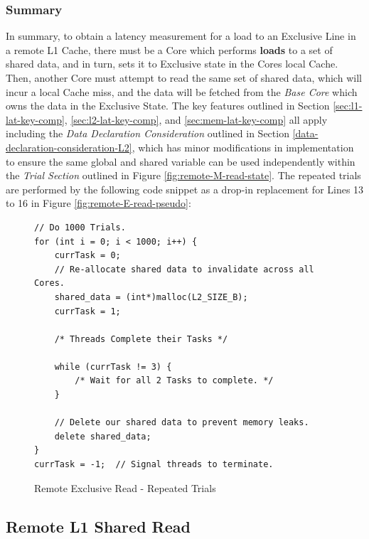 \documentclass[bsc,frontabs,twoside,singlespacing,parskip,deptreport]{infthesis}     %
\begin{document}
\subsubsection{Summary}
In summary, to obtain a latency measurement for a load to an Exclusive Line in a remote L1 Cache, there must be a Core which performs \textbf{loads} to a set of shared data, and in turn, sets it to Exclusive state in the Cores local Cache. Then, another Core must attempt to read the same set of shared data, which will incur a local Cache miss, and the data will be fetched from the \emph{Base Core} which owns the data in the Exclusive State. The key features outlined in Section \ref{sec:l1-lat-key-comp}, \ref{sec:l2-lat-key-comp}, and \ref{sec:mem-lat-key-comp} all apply including the \textit{Data Declaration Consideration} outlined in Section \ref{data-declaration-consideration-L2}, which has minor modifications in implementation to ensure the same global and shared variable can be used independently within the \textit{Trial Section} outlined in Figure \ref{fig:remote-M-read-state}. The repeated trials are performed by the following code snippet as a drop-in replacement for Lines 13 to 16 in Figure \ref{fig:remote-E-read-pseudo}:
\begin{figure}[!h]
    \centering
    \begin{minipage}{0.8\textwidth}
    \begin{verbatim}
// Do 1000 Trials.
for (int i = 0; i < 1000; i++) {
    currTask = 0;
    // Re-allocate shared data to invalidate across all Cores.
    shared_data = (int*)malloc(L2_SIZE_B);
    currTask = 1;

    /* Threads Complete their Tasks */
        
    while (currTask != 3) {
        /* Wait for all 2 Tasks to complete. */
    }

    // Delete our shared data to prevent memory leaks.
    delete shared_data;
}
currTask = -1;  // Signal threads to terminate.
    \end{verbatim}
    \end{minipage}
    \caption{Remote Exclusive Read - Repeated Trials}
    \label{fig:remote-E-repeat}
\end{figure}

\subsection{Remote L1 Shared Read}\label{sec:shared-read}
\end{document}
